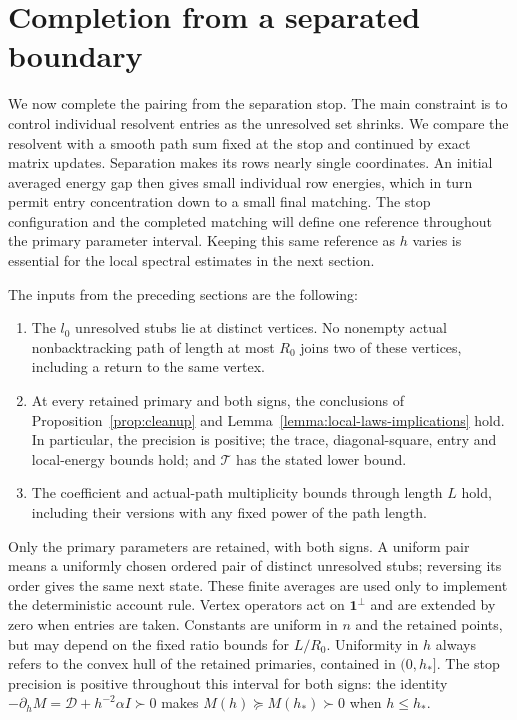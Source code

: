 \section{Completion from a separated boundary}
\label{sec:boundary-completion}

We now complete the pairing from the separation stop.  The main
constraint is to control individual resolvent entries as the unresolved
set shrinks.  We compare the resolvent with a smooth path sum fixed at the
stop and continued by exact matrix updates.  Separation makes its rows
nearly single coordinates.  An initial averaged energy gap then gives
small individual row energies, which in turn permit entry concentration
down to a small final matching.
The stop configuration and the completed matching will define one reference
throughout the primary parameter interval.  Keeping this same reference as
$h$ varies is essential for the local spectral estimates in the next section.

The inputs from the preceding sections are the following:
\begin{enumerate}
\item The $l_0$ unresolved stubs lie at distinct vertices.  No nonempty
actual nonbacktracking path of length at most $R_0$ joins two of these
vertices, including a return to the same vertex.
\item At every retained primary and both signs, the conclusions of
Proposition~\ref{prop:cleanup} and
Lemma~\ref{lemma:local-laws-implications} hold.  In particular, the
precision is positive; the trace, diagonal-square, entry and local-energy
bounds hold; and $\mathcal T$ has the stated lower bound.
\item The coefficient and actual-path multiplicity bounds through length
$L$ hold, including their versions with any fixed power of the path
length.
\end{enumerate}
Only the primary parameters are retained, with both signs.  A uniform
pair means a uniformly chosen ordered pair of distinct unresolved stubs;
reversing its order gives the same next state.  These finite averages are
used only to implement the deterministic account rule.  Vertex operators
act on $\mathbf1^\perp$ and are extended by zero when entries are taken.
Constants are uniform in $n$ and the retained points, but may depend on
the fixed ratio bounds for $L/R_0$.  Uniformity in $h$ always refers to the
convex hull of the retained primaries, contained in $(0,h_*]$.
The stop precision is positive throughout this interval for both signs:
the identity $-\partial_hM=\mathcal D+h^{-2}\alpha I\succ0$ makes
$M(h)\succeq M(h_*)\succ0$ when $h\le h_*$.

